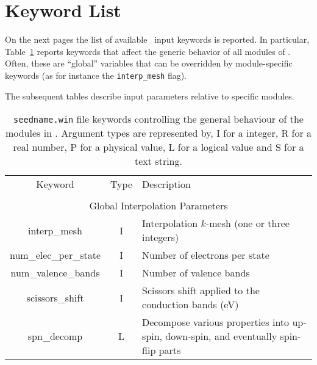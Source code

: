 \section{Keyword List}
On the next pages the list of available
\postw\ input keywords is reported.
In particular, Table~\ref{parameter_keywords_postw90} reports keywords
that affect the generic behavior of all modules of
\postw. Often, these are ``global'' variables that can be overridden
by module-specific keywords (as for instance the {\tt interp\_mesh} flag).

The subsequent tables describe input parameters relative to specific modules.

\clearpage

\begin{table}[hH!]
\begin{center}
\begin{tabular}{|c|c|p{6cm}|}
\hline
Keyword & Type & Description \\
        &      &             \\
\hline\hline
\multicolumn{3}{|c|}{Global Interpolation Parameters} \\
\hline
{\sc interp\_mesh}   & I & Interpolation $k$-mesh (one or three integers) \\
{\sc num\_elec\_per\_state}   & I & Number of electrons per state \\
{\sc num\_valence\_bands}   & I & Number of valence bands \\
{\sc scissors\_shift}   & I & Scissors shift applied to the conduction bands (eV) \\
  {\sc spn\_decomp}& L & Decompose various properties into
  up-spin, down-spin, and eventually spin-flip parts\\
\hline
\end{tabular}
\caption[Parameter file keywords controlling \postw.]
{{\tt seedname.win} file keywords controlling the general behaviour of
  the modules in \postw. Argument types
are represented by, I for a integer, R for a real number, P for a
physical value, L for a logical value and S for a text string.}
\label{parameter_keywords_postw90}
\end{center}
\end{table}


